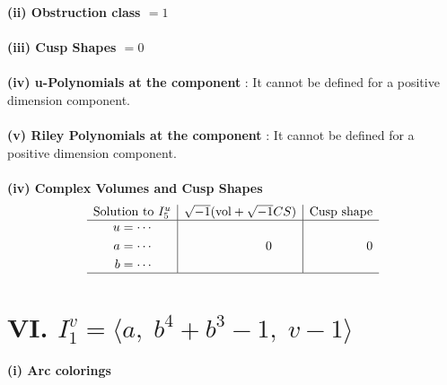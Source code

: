 \documentclass[1p]{elsarticle_modified}
\theoremstyle{definition}
\newcommand{\I}{\sqrt{-1}}
\begin{document}
\flushleft \textbf{(ii) Obstruction class $= 1$}\\~\\
\flushleft \textbf{(iii) Cusp Shapes $= 0$}\\~\\
\flushleft \textbf{(iv) u-Polynomials at the component} : It cannot be defined for a positive dimension component.\\~\\
\flushleft \textbf{(v) Riley Polynomials at the component} : It cannot be defined for a positive dimension component.\\~\\
\newpage\flushleft \textbf{(iv) Complex Volumes and Cusp Shapes}
$$\begin{array}{c|c|c} 
\text{Solution to }I^u_{5}& \I (\text{vol} + \sqrt{-1}CS) & \text{Cusp shape}\\
 \hline 
\begin{aligned}
u &= \cdots \\
a &= \cdots \\
b &= \cdots\end{aligned}
 & \phantom{-0.000000 } 0 & \phantom{-0.000000 } 0\\
 \hline 
 \end{array}
$$\newpage\renewcommand{\arraystretch}{1}
\centering \section*{VI. $I^v_{1}= \langle a,\;b^4+b^3-1,\;v-1 \rangle$}
\flushleft \textbf{(i) Arc colorings}\\
\end{document}
